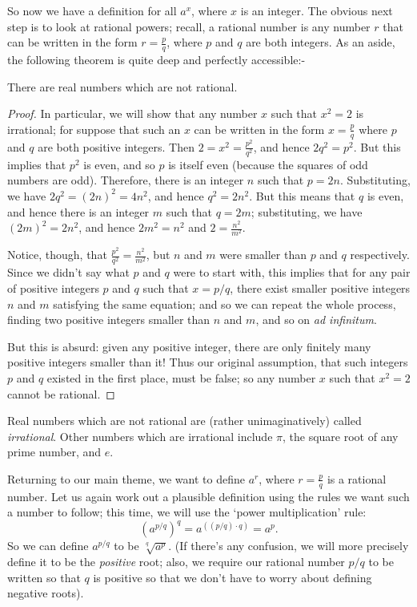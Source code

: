 So now we have a definition for all $ a^x $, where $ x $ is an integer. The obvious next step is to look at rational powers; recall, a rational number
is any number $ r $ that can be written in the form $ r = \frac{p}{q} $, where $ p $ and $ q $ are both integers. As an aside, the following theorem
is quite deep and perfectly accessible:-
\begin{thm}
  There are real numbers which are not rational.
\end{thm}
\begin{proof}
  In particular, we will show that any number $ x $ such that $ x^2 = 2 $ is irrational; for suppose that such an $ x $ can be
  written in the form $ x = \frac{p}{q} $ where $ p $ and $ q $ are both positive integers. Then $ 2 = x^2 = \frac{p^2}{q^2} $, and
  hence $ 2q^2 = p^2 $. But this implies that $ p^2 $ is even, and so $ p $ is itself even (because the squares of odd numbers are odd).
  Therefore, there is an integer $ n $ such that $ p = 2n $. Substituting, we have $ 2q^2 = (2n)^2 = 4n^2 $, and hence $ q^2 = 2n^2 $. But
  this means that $ q $ is even, and hence there is an integer $ m $ such that $ q = 2m $; substituting, we have $ (2m)^2 = 2n^2 $, and
  hence $ 2m^2 = n^2 $ and $ 2 = \frac{n^2}{m^2} $.

  Notice, though, that $ \frac{p^2}{q^2} = \frac{n^2}{m^2} $, but $ n $ and $ m $ were smaller than $ p $ and $ q $ respectively. Since we
  didn't say what $ p $ and $ q $ were to start with, this implies that for any pair of positive integers $ p $ and $ q $ such that $ x = p/q $,
  there exist smaller positive integers $ n $ and $ m $ satisfying the same equation; and so we can repeat the whole process, finding two
  positive integers smaller than $ n $ and $ m $, and so on \emph{ad infinitum}.

  But this is absurd: given any positive integer, there are only finitely many positive integers smaller than it! Thus our original assumption,
  that such integers $ p $ and $ q $ existed in the first place, must be false; so any number $ x $ such that $ x^2 = 2 $ cannot be rational.
\end{proof}
Real numbers which are not rational are (rather unimaginatively) called \emph{irrational}. Other numbers which are irrational include $ \pi $,
the square root of any prime number, and $ e $.

Returning to our main theme, we want to define $ a^r $, where $ r = \frac{p}{q} $ is a rational number. Let us again work out a plausible
definition using the rules we want such a number to follow; this time, we will use the `power multiplication' rule:
\begin{displaymath}
  \left(a^{p/q}\right)^q = a^{((p/q) \cdot q)} = a^p.
\end{displaymath}
So we can define $ a^{p/q} $ to be $ \sqrt[q]{a^p} $. (If there's any confusion, we will more precisely define it to be the \emph{positive} root; also, we
require our rational number $ p/q $ to be written so that $ q $ is positive so that we don't have to worry about defining negative roots).

